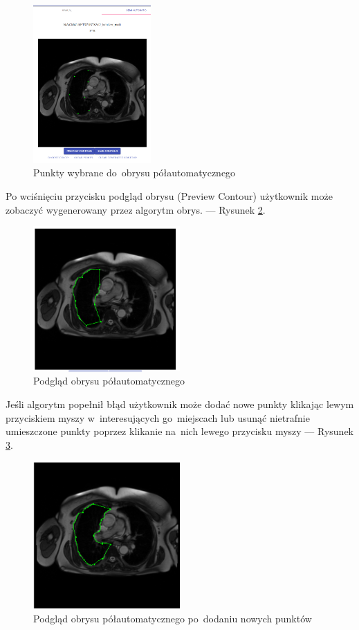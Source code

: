 \documentclass[a4paper,11pt,twoside,openright]{report}
\theoremstyle{definition}
\begin{document}
\begin{figure}[h!]
	\center
	\includegraphics[width=0.4\textwidth]{11}
	\caption{Punkty wybrane do~obrysu półautomatycznego}
    	\label{fig:11}
\end{figure}

\pagebreak

Po wciśnięciu przycisku podgląd obrysu (Preview Contour) użytkownik może
zobaczyć wygenerowany przez algorytm obrys. --- Rysunek \ref{fig:12}.

\begin{figure}[h!]
	\center
	\includegraphics[width=0.5\textwidth]{12}
	\caption{Podgląd obrysu półautomatycznego}
    	\label{fig:12}
\end{figure}

Jeśli algorytm popełnił błąd użytkownik może dodać nowe punkty klikając lewym
przyciskiem myszy w~interesujących go~miejscach lub usunąć nietrafnie umieszczone
punkty poprzez klikanie na~nich lewego przycisku myszy --- Rysunek \ref{fig:13}.

\begin{figure}[h!]
	\center
	\includegraphics[width=0.5\textwidth]{13}
	\caption{Podgląd obrysu półautomatycznego po~dodaniu nowych punktów}
    	\label{fig:13}
\end{figure}
\end{document}
